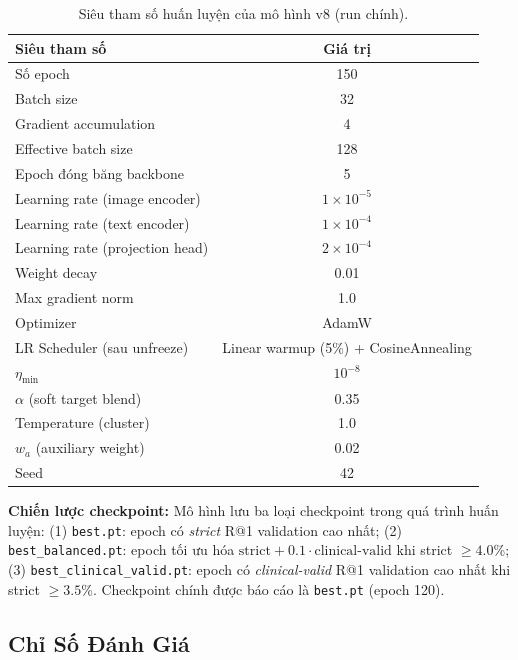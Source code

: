 \documentclass[12pt, a4paper]{article}
\begin{document}
\begin{table}[H]
  \centering
  \caption{Siêu tham số huấn luyện của mô hình v8 (run chính).}
  \label{tab:hparams}
  \begin{tabular}{lc}
    \toprule
    \textbf{Siêu tham số} & \textbf{Giá trị} \\
    \midrule
    Số epoch                     & 150 \\
    Batch size                   & 32 \\
    Gradient accumulation        & 4 \\
    Effective batch size         & 128 \\
    Epoch đóng băng backbone     & 5 \\
    \midrule
    Learning rate (image encoder)  & $1 \times 10^{-5}$ \\
    Learning rate (text encoder)   & $1 \times 10^{-4}$ \\
    Learning rate (projection head)& $2 \times 10^{-4}$ \\
    Weight decay                   & 0.01 \\
    Max gradient norm              & 1.0 \\
    Optimizer                      & AdamW \\
    \midrule
    LR Scheduler (sau unfreeze) & Linear warmup (5\%) + CosineAnnealing \\
    $\eta_\text{min}$           & $10^{-8}$ \\
    \midrule
    $\alpha$ (soft target blend)  & 0.35 \\
    Temperature (cluster)         & 1.0 \\
    $w_a$ (auxiliary weight)      & 0.02 \\
    Seed                          & 42 \\
    \bottomrule
  \end{tabular}
\end{table}

\textbf{Chiến lược checkpoint:}
Mô hình lưu ba loại checkpoint trong quá trình huấn luyện:
(1) \texttt{best.pt}: epoch có \textit{strict} R@1 validation cao nhất;
(2) \texttt{best\_balanced.pt}: epoch tối ưu hóa $\text{strict} + 0.1 \cdot
\text{clinical-valid}$ khi strict $\geq 4.0$\%;
(3) \texttt{best\_clinical\_valid.pt}: epoch có \textit{clinical-valid} R@1
validation cao nhất khi strict $\geq 3.5$\%.
Checkpoint chính được báo cáo là \texttt{best.pt} (epoch 120).

\subsection{Chỉ Số Đánh Giá}
\label{sec:metrics}
\end{document}
